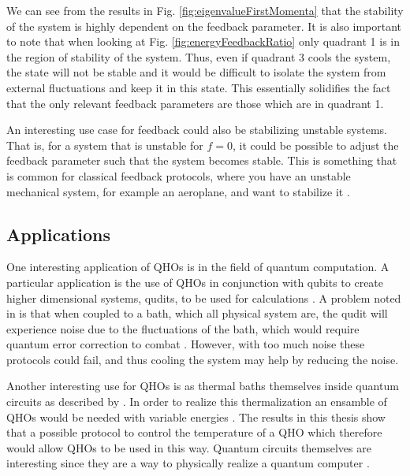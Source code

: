 We can see from the results in Fig. \ref{fig:eigenvalueFirstMomenta} that the stability of the system is highly dependent on the feedback parameter. It is also important to note that when looking at Fig. \ref{fig:energyFeedbackRatio} only quadrant 1 is in the region of stability of the system. Thus, even if quadrant 3 cools the system, the state will not be stable and it would be difficult to isolate the system from external fluctuations and keep it in this state. This essentially solidifies the fact that the only relevant feedback parameters are those which are in quadrant 1. 

An interesting use case for feedback could also be stabilizing unstable systems. That is, for a system that is unstable for $f=0$, it could be possible to adjust the feedback parameter such that the system becomes stable. This is something that is common for classical feedback protocols, where you have an unstable mechanical system, for example an aeroplane, and want to stabilize it \cite{Bechhoefer:2005}.


\subsection{Applications}
One interesting application of QHOs is in the field of quantum computation. A particular application is the use of QHOs in conjunction with qubits to create higher dimensional systems, qudits, to be used for calculations \cite{Liu:2021}. A problem noted in \cite{Liu:2021} is that when coupled to a bath, which all physical system are, the qudit will experience noise due to the fluctuations of the bath, which would require quantum error correction to combat \cite{Liu:2021}. However, with too much noise these protocols could fail, and thus cooling the system may help by reducing the noise.

Another interesting use for QHOs is as thermal baths themselves inside quantum circuits as described by \cite{Pekola:2024}. In order to realize this thermalization an ensamble of QHOs would be needed with variable energies \cite{Pekola:2024}. The results in this thesis show that a possible protocol to control the temperature of a QHO which therefore would allow QHOs to be used in this way. Quantum circuits themselves are interesting since they are a way to physically realize a quantum computer \cite{Nielsen:2010}. 